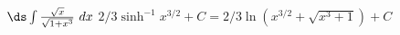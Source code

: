 {$\ds \int \frac{\sqrt{x}}{\sqrt{1+x^3}}\ dx$}
{$2/3\sinh^{-1} x^{3/2} + C = 2/3\ln (x^{3/2}+\sqrt{x^3+1})+C$}

